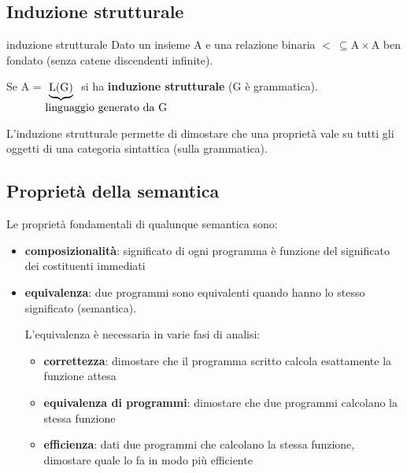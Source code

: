 \subsection{Induzione strutturale}
\begin{mydef}{induzione strutturale}
    Dato un insieme $\mathrm{A}$ e una relazione binaria $\mathrm{< \ \subseteq A \times A}$ ben fondato (senza catene discendenti infinite).

    Se $\mathrm{A}$ = $\underbrace{\mathrm{L(G)}}_{\parbox{1cm}{\text{linguaggio generato da G}}}$ si ha \textbf{induzione strutturale} ($\mathrm{G}$ è grammatica).
\end{mydef}

L'induzione strutturale permette di dimostare che una proprietà vale su tutti gli oggetti di una categoria sintattica (sulla grammatica).


\subsection{Proprietà della semantica}
Le proprietà fondamentali di qualunque semantica sono:
\begin{itemize}[label=$\circ$, itemsep=\smallskipamount]
    \item \textbf{composizionalità}: significato di ogni programma è funzione del significato dei costituenti immediati
    \item \textbf{equivalenza}: due programmi sono equivalenti quando hanno lo stesso significato (semantica).
    
    L'equivalenza è necessaria in varie fasi di analisi:
    \begin{itemize}[itemsep=\smallskipamount]
        \item \textbf{correttezza}: dimostare che il programma scritto calcola esattamente la funzione attesa
        \item \textbf{equivalenza di programmi}: dimostare che due programmi calcolano la stessa funzione
        \item \textbf{efficienza}: dati due programmi che calcolano la stessa funzione, dimostare quale lo fa in modo più efficiente
    \end{itemize}
\end{itemize}

